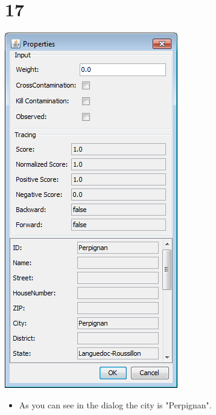 \documentclass{beamer}
\begin{document}
\section{17}
\begin{frame}
	\begin{center}
  		\includegraphics[height=0.6\textheight]{17.png}
	\end{center}
	\begin{itemize}
		\item As you can see in the dialog the city is "Perpignan".
	\end{itemize}
\end{frame}
\end{document}

